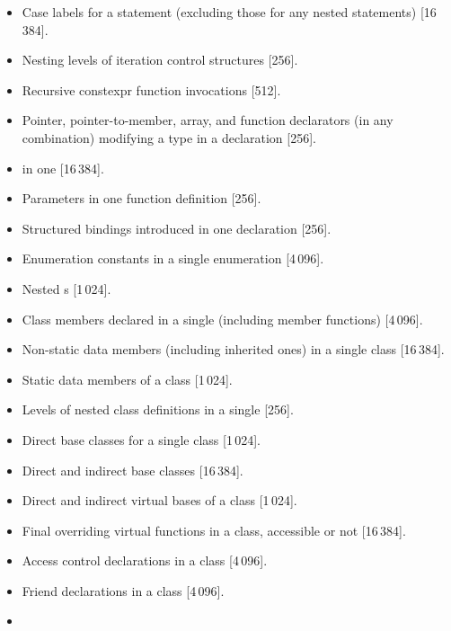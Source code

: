 \begin{itemize}
\item%
Case labels for a
statement (excluding those for any nested
statements)
[16\,384].
\item%
Nesting levels of iteration control structures [256].
\item%
Recursive constexpr function invocations [512].
\item%
Pointer,
pointer-to-member,
array, and
function
declarators (in any combination)
modifying a type in a declaration [256].
\item%
 in one  [16\,384].
\item%
Parameters in one function definition [256].
\item%
Structured bindings introduced in one declaration [256].
\item%
Enumeration constants in a single enumeration [4\,096].
\item%
Nested s [1\,024].
\item%
Class members declared in a single 
(including member functions) [4\,096].
\item%
Non-static data members (including inherited ones) in a single class [16\,384].
\item%
Static data members of a class [1\,024].
\item%
Levels of nested class definitions
in a single
[256].
\item%
Direct base classes for a single class [1\,024].
\item%
Direct and indirect base classes [16\,384].
\item%
Direct and indirect virtual bases of a class [1\,024].
\item%
Final overriding virtual functions in a class,
accessible or not [16\,384].
\item%
Access control declarations in a class [4\,096].
\item%
Friend declarations in a class [4\,096].
\item%

\end{itemize}
